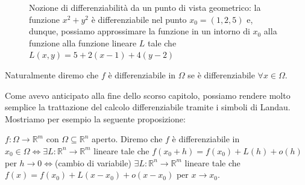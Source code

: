 \begin{figure}[htbp]
\centering
{}
\caption{Nozione di differenziabilità da un punto di vista geometrico: la funzione $x^2 + y^2$ è differenziabile nel punto $x_0=(1, 2, 5)$ e, dunque, possiamo approssimare la funzione in un intorno di $x_0$ alla funzione alla funzione lineare $L$ tale che $L(x, y) = 5 + 2(x-1) + 4(y-2)$}
\end{figure}

\begin{remark}
Naturalmente diremo che $f$ è differenziabile in $\Omega$ se è differenziabile $\forall x \in \Omega$.
\end{remark}

\noindent Come avevo anticipato alla fine dello scorso capitolo, possiamo rendere molto semplice la trattazione del calcolo differenziabile tramite i simboli di Landau. Mostriamo per esempio la seguente proposizione:

\begin{prop}
$f: \Omega \to \mathbb{R}^m$ con $\Omega \subseteq \mathbb{R}^n$ aperto. Diremo che $f$ è differenziabile in $x_0 \in \Omega \iff \exists L:\mathbb{R}^n \to \mathbb{R}^m$ lineare tale che $f(x_0 + h) = f(x_0) + L(h) + o(h)$ per $h \to 0 \iff $(cambio di variabile) $\exists L: \mathbb{R}^n \to \mathbb{R}^m$ lineare tale che $f(x) = f(x_0) + L(x-x_0) + o(x-x_0)$ per $x \to x_0$.
\end{prop}

